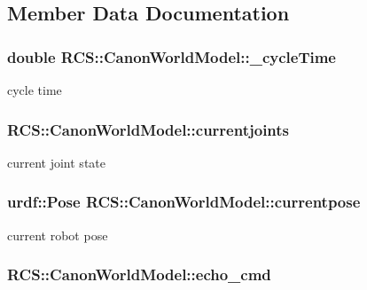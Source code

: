 \subsection{Member Data Documentation}
\hypertarget{structRCS_1_1CanonWorldModel_a8b14e4665c3491b8a68977dbf84c9479}{
\subsubsection[{\-\_\-cycle\-Time}]{\setlength{\rightskip}{0pt plus 5cm}double R\-C\-S\-::\-Canon\-World\-Model\-::\-\_\-cycle\-Time}}\label{structRCS_1_1CanonWorldModel_a8b14e4665c3491b8a68977dbf84c9479}
cycle time \hypertarget{structRCS_1_1CanonWorldModel_a0060a81cde9ecf9ae02c5e61b8345a5b}{
\subsubsection[{currentjoints}]{ R\-C\-S\-::\-Canon\-World\-Model\-::currentjoints}}\label{structRCS_1_1CanonWorldModel_a0060a81cde9ecf9ae02c5e61b8345a5b}
current joint state \hypertarget{structRCS_1_1CanonWorldModel_a1697a067100635db9d99f1bb92c50764}{
\subsubsection[{currentpose}]{\setlength{\rightskip}{0pt plus 5cm}urdf\-::\-Pose R\-C\-S\-::\-Canon\-World\-Model\-::currentpose}}\label{structRCS_1_1CanonWorldModel_a1697a067100635db9d99f1bb92c50764}
current robot pose \hypertarget{structRCS_1_1CanonWorldModel_aed51034c2dd7b1a78722fe7444691132}{
\subsubsection[{echo\-\_\-cmd}]{ R\-C\-S\-::\-Canon\-World\-Model\-::echo\-\_\-cmd}}\label{structRCS_1_1CanonWorldModel_aed51034c2dd7b1a78722fe7444691132}
